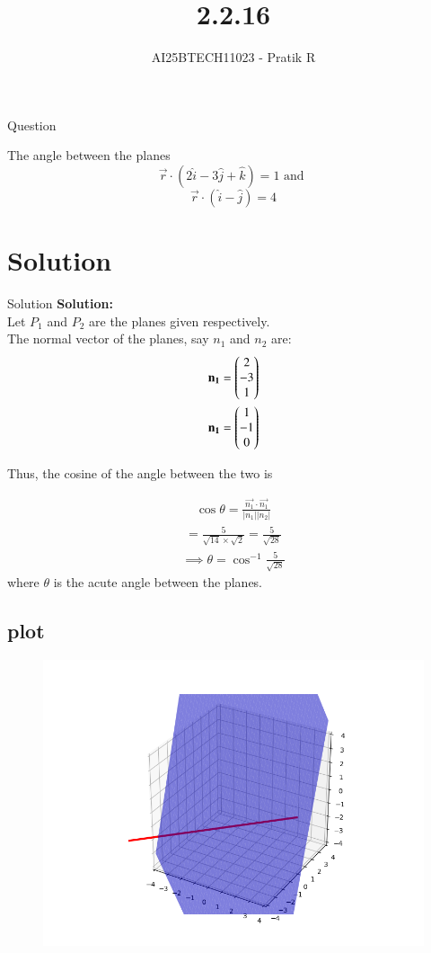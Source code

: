 \documentclass{beamer}
\title
{2.2.16}
\author 
{AI25BTECH11023 - Pratik R}
\begin{document}
\frame{\titlepage}
\begin{frame}{Question}

 The angle between the planes
$$
\vec r \cdot (2\hat{i}-3\hat{j}+\hat{k})=1 \text{ and } 
$$
$$
\vec r \cdot(\hat{i}-\hat{j})=4
$$   

\end{frame}

    

\section{Solution}
\begin{frame}{Solution}
\textbf{Solution:} 
\\
Let $P_1$ and $P_2$ are the planes given respectively. \\
The normal vector of the planes, say $n_1$ and $n_2$ are:
\begin{align}
    \mathbf {n_1}= \begin{pmatrix}2 \\ -3 \\ 1\end{pmatrix} \\
    \mathbf {n_1}= \begin{pmatrix}1 \\ -1 \\ 0\end{pmatrix}
\end{align}

Thus, the cosine of the angle between the two is


\begin{align}
   \cos \theta = \frac{\vec {n_1} \cdot \vec {n_1}}{|n_1||n_2|}  
\end{align}
\begin{align}
    = \frac{5}{\sqrt{14}\times\sqrt{2}} = \frac{5}{\sqrt{28}}
\end{align}
\begin{align}
    \implies \theta = \cos ^{-1}\frac{5}{\sqrt{28}}
\end{align}
where $\theta$ is the acute angle between the planes.

    \end{frame}
    \subsection{plot}
       \begin{frame}[fragile]
    \begin{figure}[H]
    \centering
    \includegraphics[width = 0.6\columnwidth]{../figs/fig.png}
    \caption*{}
    \label{figs}
\end{figure}
\end{frame}
\end{document}
